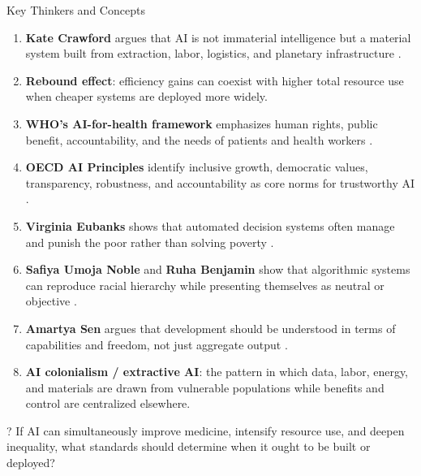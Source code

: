 \documentclass[aspectratio=169,11pt]{beamer}
\begin{document}
\begin{frame}[allowframebreaks]{Key Thinkers and Concepts}
\footnotesize
\begin{enumerate}
    \item \textbf{Kate Crawford} argues that AI is not immaterial intelligence but a material system built from extraction, labor, logistics, and planetary infrastructure \parencite{crawford_atlas_ai}.
    \item \textbf{Rebound effect}: efficiency gains can coexist with higher total resource use when cheaper systems are deployed more widely.
    \item \textbf{WHO's AI-for-health framework} emphasizes human rights, public benefit, accountability, and the needs of patients and health workers \parencite{who_ai_health_2021}.
    \item \textbf{OECD AI Principles} identify inclusive growth, democratic values, transparency, robustness, and accountability as core norms for trustworthy AI \parencite{oecd_ai_principles_2024}.
    \item \textbf{Virginia Eubanks} shows that automated decision systems often manage and punish the poor rather than solving poverty \parencite{eubanks_automating_inequality}.
    \item \textbf{Safiya Umoja Noble} and \textbf{Ruha Benjamin} show that algorithmic systems can reproduce racial hierarchy while presenting themselves as neutral or objective \parencite{noble_algorithms_oppression,benjamin_race_technology}.
    \item \textbf{Amartya Sen} argues that development should be understood in terms of capabilities and freedom, not just aggregate output \parencite{sen_development_freedom}.
    \item \textbf{AI colonialism / extractive AI}: the pattern in which data, labor, energy, and materials are drawn from vulnerable populations while benefits and control are centralized elsewhere.
\end{enumerate}

\begin{alertblock}{?}
If AI can simultaneously improve medicine, intensify resource use, and deepen inequality, what standards should determine when it ought to be built or deployed?
\end{alertblock}
\end{frame}
\end{document}
